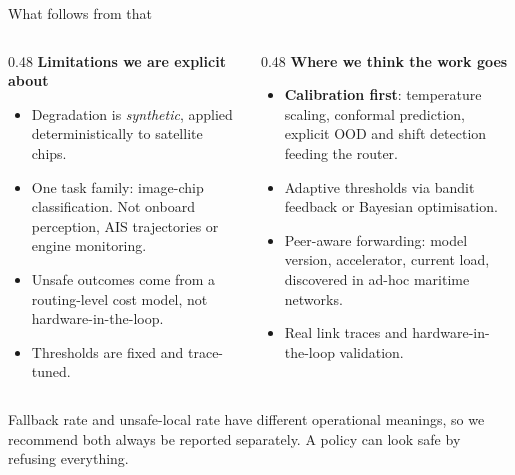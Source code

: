 \documentclass[aspectratio=169, 11pt]{beamer}
\newcommand{\shout}[1]{{\color{navy}\bfseries #1}}
\begin{document}
\begin{frame}{What follows from that}

\vspace{0.5em}
\begin{columns}[T]
\begin{column}{0.48\textwidth}
  \textbf{\color{corange}Limitations we are explicit about}
  \begin{itemize}\setlength\itemsep{0.42em}\small
    \item Degradation is \emph{synthetic}, applied deterministically to satellite chips.
    \item One task family: image-chip classification. Not onboard perception, AIS trajectories or engine monitoring.
    \item Unsafe outcomes come from a routing-level cost model, not hardware-in-the-loop.
    \item Thresholds are fixed and trace-tuned.
  \end{itemize}
\end{column}
\begin{column}{0.48\textwidth}
  \textbf{\color{navy}Where we think the work goes}
  \begin{itemize}\setlength\itemsep{0.42em}\small
    \item \shout{Calibration first}: temperature scaling, conformal prediction, explicit OOD and shift detection feeding the router.
    \item Adaptive thresholds via bandit feedback or Bayesian optimisation.
    \item Peer-aware forwarding: model version, accelerator, current load, discovered in ad-hoc maritime networks.
    \item Real link traces and hardware-in-the-loop validation.
  \end{itemize}
\end{column}
\end{columns}

\vspace{0.7em}
{\color{ink2}\small Fallback rate and unsafe-local rate have different operational meanings, so we recommend both always be reported separately. A policy can look safe by refusing everything.}
\end{frame}
\end{document}
